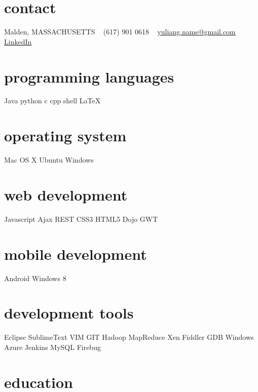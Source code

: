 \documentclass[]{ly-cv} %
\begin{document}
\begin{aside} %
\section{contact}
Malden, MASSACHUSETTS
~
(617) 901 0618
~
\href{mailto:yuliang.name@gmail.com}{yuliang.name@gmail.com}
\href{http://www.linkedin.com/in/liangyu2012neu}{LinkedIn}

\section{programming languages}
Java python c cpp 
shell \LaTeX

\section{operating system}
Mac OS X Ubuntu Windows
\section{web development}
Javascript Ajax REST
CSS3 HTML5 Dojo GWT
\section{mobile development}
Android Windows 8
\section{development tools}
Eclipse SublimeText VIM
GIT Hadoop MapReduce Xen
Fiddler GDB Windows Azure
Jenkins MySQL Firebug
\end{aside}


\section{education}
\end{document}
